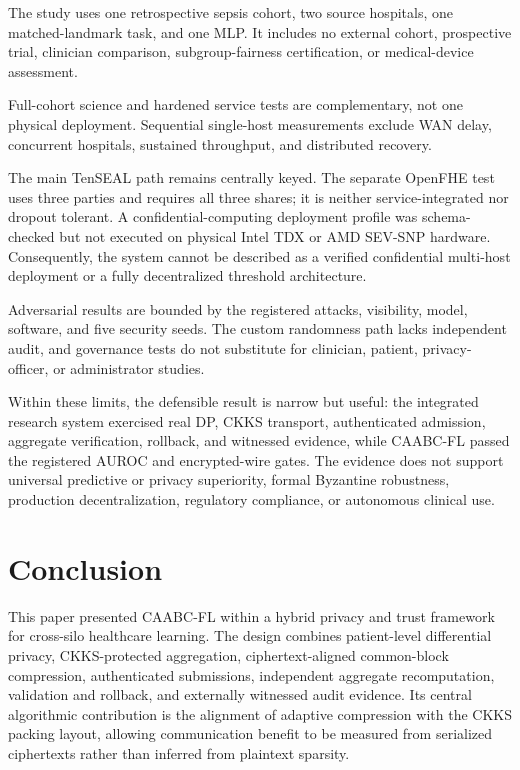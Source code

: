 \documentclass[conference]{IEEEtran}
\begin{document}
The study uses one retrospective sepsis cohort, two source hospitals, one
matched-landmark task, and one MLP. It includes no external cohort, prospective
trial, clinician comparison, subgroup-fairness certification, or medical-device
assessment.

Full-cohort science and hardened service tests are complementary, not one
physical deployment. Sequential single-host measurements exclude WAN delay,
concurrent hospitals, sustained throughput, and distributed recovery.

The main TenSEAL path remains centrally keyed. The separate OpenFHE test uses
three parties and requires all three shares; it is neither service-integrated nor
dropout tolerant. A confidential-computing deployment profile was schema-checked
but not executed on physical Intel TDX or AMD SEV-SNP hardware. Consequently,
the system cannot be described as a verified confidential multi-host deployment
or a fully decentralized threshold architecture.

Adversarial results are bounded by the registered attacks, visibility, model,
software, and five security seeds. The custom randomness path lacks independent
audit, and governance tests do not substitute for clinician, patient, privacy-
officer, or administrator studies.

Within these limits, the defensible result is narrow but useful: the integrated
research system exercised real DP, CKKS transport, authenticated admission,
aggregate verification, rollback, and witnessed evidence, while CAABC-FL passed
the registered AUROC and encrypted-wire gates. The evidence does not support
universal predictive or privacy superiority, formal Byzantine robustness,
production decentralization, regulatory compliance, or autonomous clinical use.

\section{Conclusion}
\label{sec:conclusion}

This paper presented CAABC-FL within a hybrid privacy and trust framework for
cross-silo healthcare learning. The design combines patient-level differential
privacy, CKKS-protected aggregation, ciphertext-aligned common-block
compression, authenticated submissions, independent aggregate recomputation,
validation and rollback, and externally witnessed audit evidence. Its central
algorithmic contribution is the alignment of adaptive compression with the CKKS
packing layout, allowing communication benefit to be measured from serialized
ciphertexts rather than inferred from plaintext sparsity.
\end{document}
